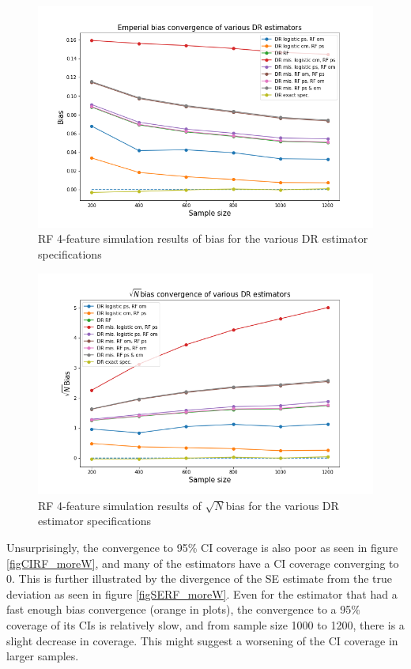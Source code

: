 \documentclass[12pt,twoside]{article}
\begin{document}
\begin{figure}[h!]
    \centering
    \includegraphics[width = 0.9\columnwidth]{figures/biasRF_moreW.png}
    \caption{RF 4-feature simulation results of bias for the various DR estimator specifications}
    \label{figbiasRF_moreW}
\end{figure}

\begin{figure}[h!]
    \centering
    \includegraphics[width = 0.9\columnwidth]{figures/sqrtnRF_moreW.png}
    \caption{RF 4-feature simulation results of $\sqrt{N}$bias for the various DR estimator specifications}
    \label{figsqrtnRF_moreW}
\end{figure}

Unsurprisingly, the convergence to 95\% CI coverage is also poor as seen in figure \ref{figCIRF_moreW}, and many of the estimators have a CI coverage converging to 0. This is further illustrated by the divergence of the SE estimate from the true deviation as seen in figure \ref{figSERF_moreW}. Even for the estimator that had a fast enough bias convergence (orange in plots), the convergence to a 95\% coverage of its CIs is relatively slow, and from sample size 1000 to 1200, there is a slight decrease in coverage. This might suggest a worsening of the CI coverage in larger samples.
\end{document}
